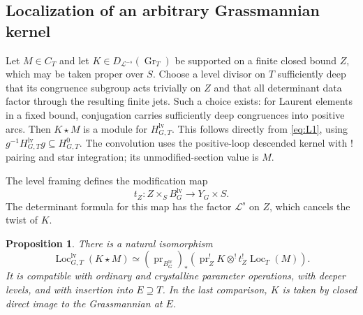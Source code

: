 \documentclass[11pt]{article}
\numberwithin{equation}{section}
\newtheorem{proposition}[theorem]{Proposition}
\theoremstyle{definition}
\theoremstyle{remark}
\begin{document}
\subsection{Localization of an arbitrary Grassmannian kernel}

Let $M\in C_T$ and let
$K\in D_{\mathcal L^{-s}}(\operatorname{Gr}_T)$ be supported on a
finite closed bound $Z$, which may be taken proper over $S$.  Choose a
level divisor on $T$ sufficiently deep that its congruence subgroup
acts trivially on $Z$ and that all determinant data factor through
the resulting finite jets.  Such a choice exists: for Laurent elements
in a fixed bound, conjugation carries sufficiently deep congruences
into positive arcs.  Then $K\star M$ is a module for
$H_{G,T}^{\mathrm{lv}}$.  This follows directly from \eqref{eq:L1},
using $g^{-1}H_{G,T}^{\mathrm{lv}}g\subseteq H_{G,T}^0$.
The convolution uses the positive-loop descended kernel with $!$
pairing and star integration; its unmodified-section value is $M$.

The level framing defines the modification map
\[
 t_Z:Z\times_S B_G^{\mathrm{lv}}\longrightarrow Y_G\times S.
\]
The determinant formula for this map has the factor $\mathcal L^s$
on $Z$, which cancels the twist of $K$.

\begin{proposition}\label{loc:kernel}
There is a natural isomorphism
\begin{equation}\label{eq:T6}
 \operatorname{Loc}_{G,T}^{\mathrm{lv}}(K\star M)
 \simeq
 (\operatorname{pr}_{B_G^{\mathrm{lv}}})_*
 \left(\operatorname{pr}_Z^!K\otimes^!
                         t_Z^!\operatorname{Loc}_T(M)\right).
\end{equation}
It is compatible with ordinary and crystalline parameter operations,
with deeper levels, and with insertion into $E\supseteq T$.  In the
last comparison, $K$ is taken by closed direct image to the
Grassmannian at $E$.
\end{proposition}
\end{document}
